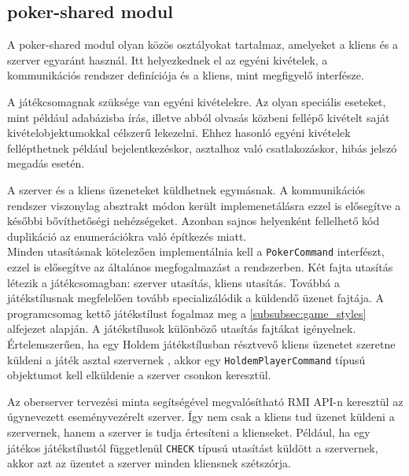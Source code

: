 \subsection{poker-shared modul}
A poker-shared modul olyan közös osztályokat tartalmaz, amelyeket a kliens és a szerver egyaránt használ. Itt helyezkednek el az egyéni kivételek, a kommunikációs rendszer definíciója és a kliens, mint megfigyelő interfésze.

A játékcsomagnak szüksége van egyéni kivételekre. Az olyan speciális eseteket, mint például adabázisba írás, illetve abból olvasás közbeni fellépő kivételt saját kivételobjektumokkal célszerű lekezelni. Ehhez hasonló egyéni kivételek fellépthetnek például bejelentkezéskor, asztalhoz való csatlakozáskor, hibás jelszó megadás esetén.

A szerver és a kliens üzeneteket küldhetnek egymásnak. A kommunikációs rendszer viszonylag absztrakt módon került implemenetálásra ezzel is elősegítve a későbbi bővíthetőségi nehézségeket. Azonban sajnos helyenként fellelhető kód duplikáció az enumerációkra való építkezés miatt. \\
Minden utasításnak kötelezően implementálnia kell a \texttt{PokerCommand} interfészt, ezzel is elősegítve az általános megfogalmazást a rendszerben. Két fajta utasítás létezik a játékcsomagban: szerver utasítás, kliens utasítás.
Továbbá a játékstílusnak megfelelően tovább specializálódik a küldendő üzenet fajtája. A programcsomag kettő játékstílust fogalmaz meg a \ref{subsubsec:game_styles} alfejezet alapján. A játékstílusok különböző utasítás fajtákat igényelnek. Értelemszerűen, ha egy Holdem játékstílusban résztvevő kliens üzenetet szeretne küldeni a játék asztal szervernek , akkor egy \texttt{HoldemPlayerCommand} típusú objektumot kell elküldenie a szerver csonkon keresztül.

Az oberserver tervezési minta segítségével megvalósítható RMI API-n keresztül az úgynevezett eseményvezérelt szerver. Így nem csak a kliens tud üzenet küldeni a szervernek, hanem a szerver is tudja értesíteni a klienseket. Például, ha egy játékos játékstílustól függetlenül \texttt{CHECK} típusú utasítást küldött a szervernek, akkor azt az üzentet a szerver minden kliensnek szétszórja.

